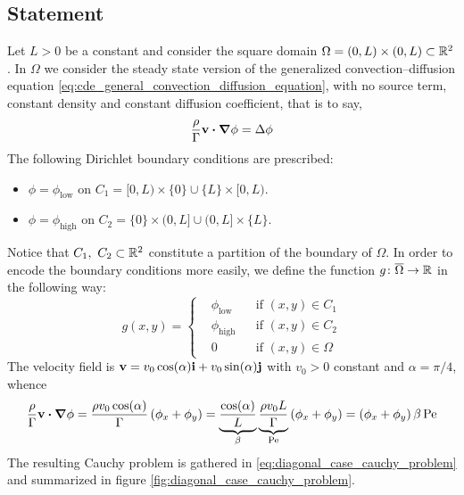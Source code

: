 
\subsection{Statement}

Let $L > 0$ be a constant and consider the square domain $\Omega = (0,L) \times
(0,L) \subset \mathbb{R}^2$. In $\Omega$ we consider the steady state version of the
generalized convection--diffusion equation
\eqref{eq:cde_general_convection_diffusion_equation}, with no source term,
constant density and constant diffusion coefficient, that is to say,
\begin{equation*}
	\frac{\rho}{\Gamma} \vb{v} \vdot \grad{\phi} = \Delta{\phi}
\end{equation*}
The following Dirichlet boundary conditions are prescribed:
\begin{itemize}[topsep=0pt]
	\item $\phi = \phi_\text{low}$ on $C_1 = [0,L) \times \{ 0 \} \cup \{ L \}
	\times [0,L)$.
	\item $\phi = \phi_\text{high}$ on $C_2 = \{ 0 \} \times (0,L] \cup (0,L]
	\times \{ L \}$.
\end{itemize}
Notice that $C_1, \ C_2 \subset \mathbb{R}^2$ constitute a partition of the boundary
of $\Omega$. In order to encode the boundary conditions more easily, we define
the function $g \colon \overline{\Omega} \rightarrow \mathbb{R}$ in the following way:
\begin{equation*}
	g(x,y) =
	\left\{
	\begin{aligned}
		&\phi_\text{low} 	& &\text{if } (x,y) \in C_1 \\
		&\phi_\text{high} 	& &\text{if } (x,y) \in C_2 \\
		&0					& &\text{if } (x,y) \in \Omega
	\end{aligned}
	\right.
\end{equation*}
The velocity field is $\vb{v} = v_0 \cos(\alpha) \vb{i} + v_0 \sin(\alpha)
\vb{j}$ with $v_0 > 0$ constant and $\alpha = \pi / 4$, whence
\begin{equation*}
	\frac{\rho}{\Gamma} \vb{v} \vdot \grad{\phi} = 
	\frac{\rho v_0 \cos(\alpha)}{\Gamma} \left( \phi_x + \phi_y \right) = 
	\underbrace{\frac{\cos(\alpha)}{L}}_{\beta} 
	\underbrace{\frac{\rho v_0 L}{\Gamma}}_{\peclet} \left( \phi_x + \phi_y \right) = 
	\left( \phi_x + \phi_y \right) \beta \, \peclet 
\end{equation*}
The resulting Cauchy problem is gathered in
\eqref{eq:diagonal_case_cauchy_problem} and summarized in figure
\ref{fig:diagonal_case_cauchy_problem}.
